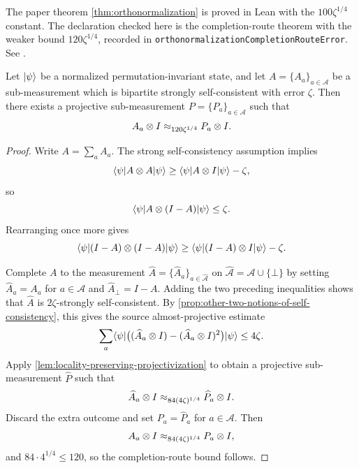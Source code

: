 \begin{proposition}\label{prop:orthonormalization-completion-route}
	\leanok

	The paper theorem \ref{thm:orthonormalization} is proved in Lean with the
	\(100\zeta^{1/4}\) constant.  The declaration checked here is the
	completion-route theorem with the weaker bound
	\(120\zeta^{1/4}\), recorded in
	\texttt{orthonormalizationCompletionRouteError}.  See
	\cite{gap:issue-1032-orthonormalization-constant}.

	Let \(\lvert \psi \rangle\) be a normalized permutation-invariant state, and let
	\(A=\{A_a\}_{a\in\mathcal A}\) be a sub-measurement which is bipartite
	strongly self-consistent with error \(\zeta\).  Then there exists a
	projective sub-measurement \(P=\{P_a\}_{a\in\mathcal A}\) such that
	\[
		A_a \otimes I \approx_{120\zeta^{1/4}} P_a \otimes I.
	\]
\end{proposition}
\begin{proof}
	\leanok
	Write \(A=\sum_a A_a\).  The strong self-consistency assumption implies
	\[
		\langle \psi \rvert A \otimes A \lvert \psi \rangle
		\geq
		\langle \psi \rvert A \otimes I \lvert \psi \rangle - \zeta,
	\]
	so
	\[
		\langle \psi \rvert A \otimes (I-A) \lvert \psi \rangle \leq \zeta.
	\]
	Rearranging once more gives
	\[
		\langle \psi \rvert (I-A) \otimes (I-A) \lvert \psi \rangle
		\geq
		\langle \psi \rvert (I-A) \otimes I \lvert \psi \rangle - \zeta.
	\]

	Complete \(A\) to the measurement
	\(\widehat A=\{\widehat A_a\}_{a \in \widehat{\mathcal A}}\) on
	\(\widehat{\mathcal A}=\mathcal A \cup \{\bot\}\) by setting
	\(\widehat A_a=A_a\) for \(a \in \mathcal A\) and
	\(\widehat A_{\bot}=I-A\).  Adding the two preceding inequalities shows
	that \(\widehat A\) is \(2\zeta\)-strongly self-consistent.  By
	\ref{prop:other-two-notions-of-self-consistency}, this gives the source
	almost-projective estimate
	\[
		\sum_a \langle \psi \rvert
		\bigl((\widehat A_a\otimes I)-(\widehat A_a\otimes I)^2\bigr)
		\lvert \psi \rangle
		\le 4\zeta.
	\]
	Apply \ref{lem:locality-preserving-projectivization} to obtain a projective
	sub-measurement \(\widehat P\) such that
	\[
		\widehat A_a \otimes I \approx_{84(4\zeta)^{1/4}} \widehat P_a \otimes I.
	\]
	Discard the extra outcome and set \(P_a=\widehat P_a\) for
	\(a \in \mathcal A\).  Then
	\[
		A_a \otimes I \approx_{84(4\zeta)^{1/4}} P_a \otimes I,
	\]
	and \(84 \cdot 4^{1/4} \leq 120\), so the completion-route bound follows.
\end{proof}

